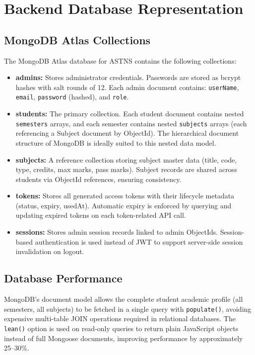 \documentclass[12pt,a4paper]{report}
\begin{document}
\section{Backend Database Representation}

\subsection{MongoDB Atlas Collections}
The MongoDB Atlas database for ASTNS contains the following collections:

\begin{itemize}
  \item \textbf{admins:} Stores administrator credentials. Passwords are stored as bcrypt hashes with salt rounds of 12. Each admin document contains: \texttt{userName}, \texttt{email}, \texttt{password} (hashed), and \texttt{role}.

  \item \textbf{students:} The primary collection. Each student document contains nested \texttt{semesters} arrays, and each semester contains nested \texttt{subjects} arrays (each referencing a Subject document by ObjectId). The hierarchical document structure of MongoDB is ideally suited to this nested data model.

  \item \textbf{subjects:} A reference collection storing subject master data (title, code, type, credits, max marks, pass marks). Subject records are shared across students via ObjectId references, ensuring consistency.

  \item \textbf{tokens:} Stores all generated access tokens with their lifecycle metadata (status, expiry, usedAt). Automatic expiry is enforced by querying and updating expired tokens on each token-related API call.

  \item \textbf{sessions:} Stores admin session records linked to admin ObjectIds. Session-based authentication is used instead of JWT to support server-side session invalidation on logout.
\end{itemize}

\subsection{Database Performance}
MongoDB's document model allows the complete student academic profile (all semesters, all subjects) to be fetched in a single query with \texttt{populate()}, avoiding expensive multi-table JOIN operations required in relational databases. The \texttt{lean()} option is used on read-only queries to return plain JavaScript objects instead of full Mongoose documents, improving performance by approximately 25--30\%.
\end{document}
